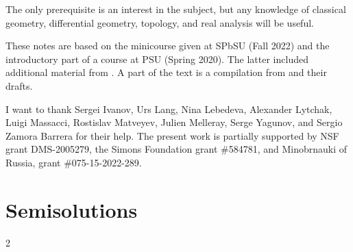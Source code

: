 \documentclass[twoside]{book}
\begin{document}
The only prerequisite is an interest in the subject,
but any knowledge of classical geometry, differential geometry, topology, and real analysis will be useful. 

These notes are based on the minicourse given at SPbSU (Fall 2022) and the introductory part of a course at PSU (Spring 2020).
The latter included additional material from \cite{alexander-kapovitch-petrunin-2019,petrunin2020mnfld,nabutovsky}.
A part of the text is a compilation from \cite{alexander-kapovitch-petrunin-2019, alexander-kapovitch-petrunin-2025, petrunin-yashinski, petrunin-2022-PIGTIKAL, petrunin-zamorabarrera} and their drafts.

I want to thank
Sergei Ivanov,
Urs Lang,
Nina Lebedeva,
Alexander Lytchak,
Luigi Massacci,
Rostislav Matveyev,
Julien Melleray,
Serge Yagunov,
and Sergio Zamora Barrera for their help.
The present work is partially supported by NSF grant DMS-2005279,
the Simons Foundation grant \#584781,
and Minobrnauki of Russia, grant \#075-15-2022-289.

\thispagestyle{empty}
\cleardoublepage
{}
{}
\tableofcontents
\thispagestyle{empty}






%

\backmatter

\chapter{Semisolutions}

{

\footnotesize
\begin{multicols}{2}







\end{multicols}
}


{\small\sloppy


\def\emph{\textit}

\printbibliography[heading=bibintoc]
\fussy
}
\end{document}
